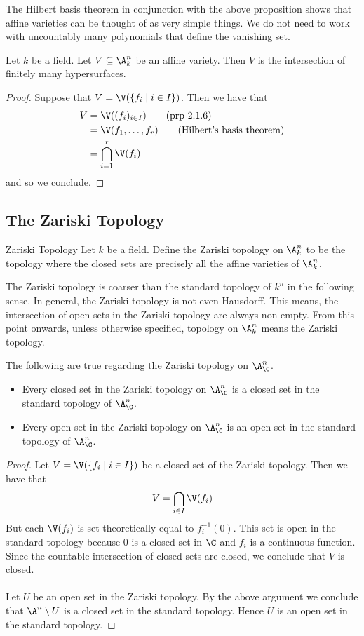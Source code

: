 \documentclass[a4paper]{article}
\begin{document}
The Hilbert basis theorem in conjunction with the above proposition shows that affine varieties can be thought of as very simple things. We do not need to work with uncountably many polynomials that define the vanishing set. 

\begin{crl}{}{} Let $k$ be a field. Let $V\subseteq\A_k^n$ be an affine variety. Then $V$ is the intersection of finitely many hypersurfaces. \tcbline
\begin{proof}
Suppose that $V=\V(\{f_i\;|\;i\in I\})$. Then we have that 
\begin{align*}
V&=\V((f_i)_{i\in I})\tag{prp 2.1.6}\\
&=\V(f_1,\dots,f_r)\tag{Hilbert's basis theorem}\\
&=\bigcap_{i=1}^r\V(f_i)
\end{align*}
and so we conclude. 
\end{proof}
\end{crl}

\subsection{The Zariski Topology}
\begin{defn}{Zariski Topology}{} Let $k$ be a field. Define the Zariski topology on $\A_k^n$ to be the topology where the closed sets are precisely all the affine varieties of $\A_k^n$. 
\end{defn}

The Zariski topology is coarser than the standard topology of $k^n$ in the following sense. In general, the Zariski topology is not even Hausdorff. This means, the intersection of open sets in the Zariski topology are always non-empty. From this point onwards, unless otherwise specified, topology on $\A_k^n$ means the Zariski topology. 

\begin{lmm}{}{} The following are true regarding the Zariski topology on $\A_\C^n$. 
\begin{itemize}
\item Every closed set in the Zariski topology on $\A_\C^n$ is a closed set in the standard topology of $\A_\C^n$. 
\item Every open set in the Zariski topology on $\A_\C^n$ is an open set in the standard topology of $\A_\C^n$. 
\end{itemize} \tcbline
\begin{proof}
Let $V=\V(\{f_i\;|\;i\in I\})$ be a closed set of the Zariski topology. Then we have that $$V=\bigcap_{i\in I}\V(f_i)$$ But each $\V(f_i)$ is set theoretically equal to $f_i^{-1}(0)$. This set is open in the standard topology because $0$ is a closed set in $\C$ and $f_i$ is a continuous function. Since the countable intersection of closed sets are closed, we conclude that $V$ is closed. \\~\\

Let $U$ be an open set in the Zariski topology. By the above argument we conclude that $\A^n\setminus U$ is a closed set in the standard topology. Hence $U$ is an open set in the standard topology. 
\end{proof}
\end{lmm}
\end{document}
